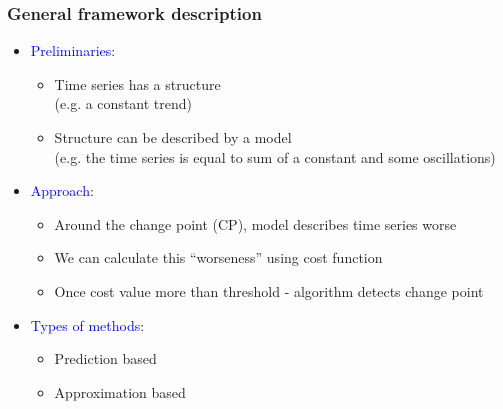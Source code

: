 \documentclass[intlimits, 9pt, unicode]{beamer}
\newcommand{\textblue}[1]{\textcolor{blue}{#1}}
\begin{document}
\begin{frame}
    \frametitle{General framework description}

	    \begin{itemize}
		\item \textblue{Preliminaries}:
		\begin{itemize}
			\item Time series has a structure\\ (e.g. a constant trend)
\vspace{0.1cm}
			\item Structure can be described by a model\\
             (e.g. the time series is equal to sum of a constant and some oscillations)
\vspace{0.1cm}
		\end{itemize}

\vspace{0.2cm}
		\item \textblue{Approach}:
		\begin{itemize}
			\item Around the change point (CP), model describes time series worse
			\item We can calculate this ``worseness'' using cost function
			\item Once cost value more than threshold - algorithm detects change point
		\end{itemize}

\vspace{0.2cm}
		\item \textblue{Types of methods}:
		\begin{itemize}
			\item Prediction based
			\item Approximation based
		\end{itemize}
	    \end{itemize}

\end{frame}
\end{document}

